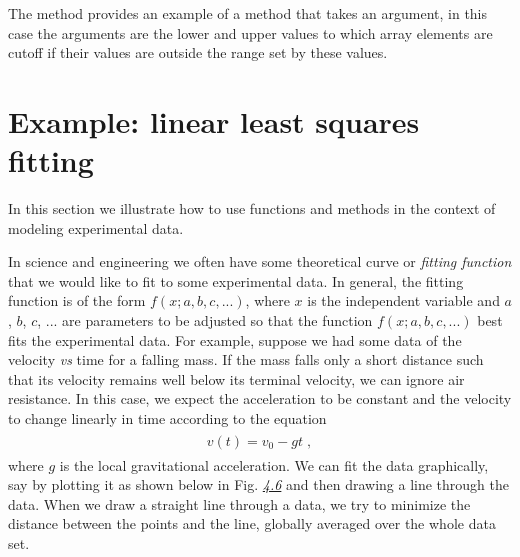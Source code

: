 \documentclass[letterpaper,10pt,english]{sphinxmanual}
\begin{document}
The  method provides an example of a method that takes an argument, in this case the arguments are the lower and upper values to which array elements are cutoff if their values are outside the range set by these values.


\section{Example: linear least squares fitting}
\label{chap7/chap7_funcs:example-linear-least-squares-fitting}\label{chap7/chap7_funcs:linfitfunc}\label{chap7/chap7_funcs:index-5}
In this section we illustrate how to use functions and methods in the context of modeling experimental data.

In science and engineering we often have some theoretical curve or \emph{fitting function} that we would like to fit to some experimental data.  In general, the fitting function is of the form \(f(x; a, b, c, ...)\), where \(x\) is the independent variable and \(a\), \(b\), \(c\), ... are parameters to be adjusted so that the function \(f(x; a, b, c, ...)\) best fits the experimental data.  For example, suppose we had some data of the velocity \emph{vs} time for a falling mass.  If the mass falls only a short distance such that its velocity remains well below its terminal velocity, we can ignore air resistance.  In this case, we expect the acceleration to be constant and the velocity to change linearly in time according to the equation
\label{chap7/chap7_funcs:equation-eq:veltime}\begin{gather}
\begin{split}v(t) = v_{0} - g t \;,\end{split}\label{chap7/chap7_funcs-eq:veltime}
\end{gather}
where \(g\) is the local gravitational acceleration.  We can fit the data graphically, say by plotting it as shown below in Fig. {\hyperref[chap7/chap7_funcs:fig-fallingmassdataplot]{\emph{4.6}}} and then drawing a line through the data.  When we draw a straight line through a data, we try to minimize the distance between the points and the line, globally averaged over the whole data set.
\end{document}
